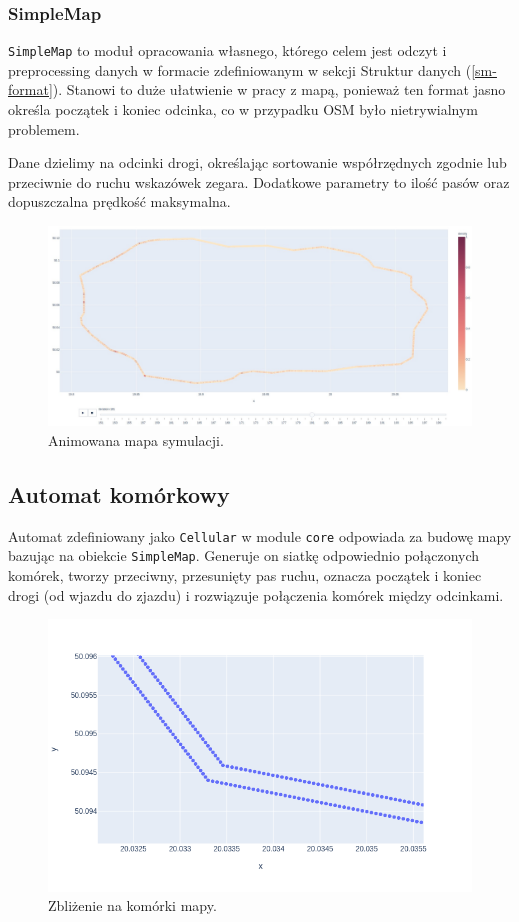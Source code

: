 \documentclass[a4paper,12pt]{article}
\begin{document}
    \subsubsection{SimpleMap}
    \texttt{SimpleMap} to moduł opracowania własnego, którego celem jest odczyt i preprocessing danych w formacie zdefiniowanym w sekcji Struktur danych (\ref{sm-format}).
    Stanowi to duże ułatwienie w pracy z mapą, ponieważ ten format jasno określa początek i koniec odcinka, co w przypadku OSM było nietrywialnym problemem.
    
    Dane dzielimy na odcinki drogi, określając sortowanie współrzędnych zgodnie lub przeciwnie do ruchu wskazówek zegara. Dodatkowe parametry to ilość pasów oraz dopuszczalna prędkość maksymalna.
    
    \begin{figure}[H]
    	\centering
    	\includegraphics[width=\textwidth]{img/sim-map.jpg}
    	\caption{Animowana mapa symulacji.}
    \end{figure}
    
    \subsection{Automat komórkowy}
    Automat zdefiniowany jako \texttt{Cellular} w module \texttt{core} odpowiada za budowę mapy bazując na obiekcie \texttt{SimpleMap}. Generuje on siatkę odpowiednio połączonych komórek, tworzy przeciwny, przesunięty pas ruchu, oznacza początek i koniec drogi (od wjazdu do zjazdu) i rozwiązuje połączenia komórek między odcinkami.
    
    \begin{figure}[H]
    	\centering
    	\includegraphics[width=\textwidth]{img/note-map-zoom.png}
    	\caption{Zbliżenie na komórki mapy.}
    \end{figure}
\end{document}
